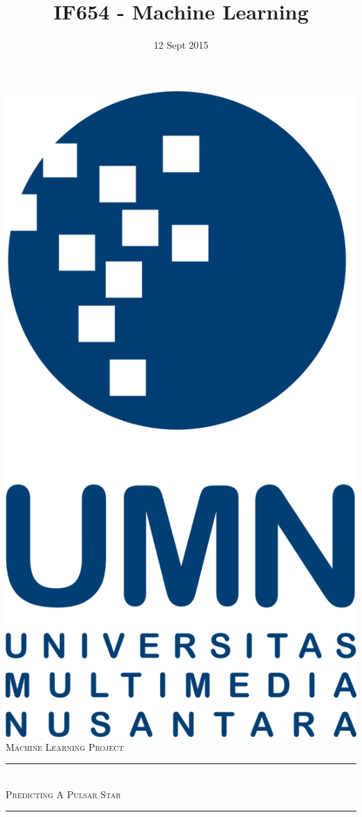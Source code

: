 \documentclass[12pt]{article}
\title{IF654 - Machine Learning}								%
\date{12 Sept 2015}											%
\makeatletter
\let\thetitle\@title
\makeatother
\begin{document}

\begin{titlepage}
	\centering
    \vspace*{0.5 cm}
    \includegraphics[scale = 0.1]{logo-umn.png}\\[1.0 cm]	%
    \textsc{\LARGE Machine Learning Project}\\[2.0 cm]	%
	\rule{\linewidth}{0.2 mm} \\[1.5 cm]
	 \textsc{\LARGE Predicting A Pulsar Star}\\[1.0 cm]
	\rule{\linewidth}{0.2 mm} \\[1.5 cm]
	

\end{titlepage}
\end{document}
